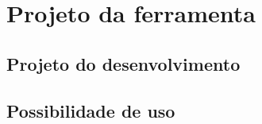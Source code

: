 \chapter{Projeto da ferramenta}
\lipsum[1-4]

\section{Projeto do desenvolvimento}
\lipsum[1-4]

\section{Possibilidade de uso}
\lipsum[1-4]
